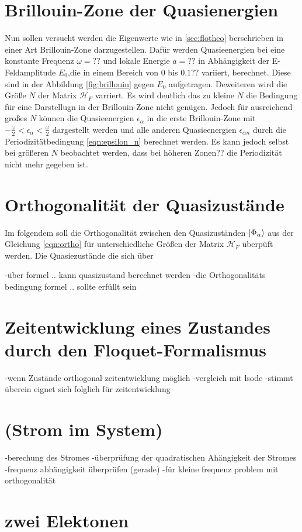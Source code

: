 \section{Brillouin-Zone der Quasienergien}
Nun sollen versucht werden die Eigenwerte wie in \ref{sec:flotheo} berschrieben in einer Art Brillouin-Zone darzugestellen.
Dafür werden Quasieenergien bei eine konstante Frequenz $\omega=??$ und lokale Energie $a=??$ in Abhängigkeit der
E-Feldamplitude $E_0$,die in einem
Bereich von $0$ bis $0.1 ??$ variiert,  berechnet.
Diese sind in der Abbildung \ref{fig:brillouin} gegen $E_0$ aufgetragen.
Deweiteren wird die Größe $N$ der Matrix $\mathcal{H}_F$ varriert.
Es wird deutlich das zu kleine $N$ die Bedingung für eine Darstellugn in der Brillouin-Zone nicht genügen.
Jedoch für ausreichend großes $N$ können die Quasieenergien $\epsilon_\alpha$ in die erste Brillouin-Zone
mit $-\frac{\omega}{2}<\epsilon_\alpha<\frac{\omega}{2}$ dargestellt werden und
alle anderen Quasieenergien $\epsilon_{\alpha n}$ durch die Periodizitätbedingung \eqref{eqn:epsilon_n} berechnet werden.
Es kann jedoch selbst bei größeren $N$ beobachtet werden, dass bei höheren Zonen?? die Periodizität nicht mehr gegeben ist.

\section{Orthogonalität der Quasizustände}
Im folgendem soll die Orthogonalität zwischen den Quasizuständen $\ket{\Phi_\alpha}$ aus der Gleichung \eqref{eqn:ortho} für
unterschiedliche Größen der Matrix $\mathcal{H}_F$ überpüft werden.
Die Quasiezustände die sich über


-über formel .. kann quasizustand berechnet werden
-die Orthogonalitäts bedingung formel .. sollte erfüllt sein

\section{Zeitentwicklung eines Zustandes durch den Floquet-Formalismus}
-wenn Zustände orthogonal zeitentwicklung möglich
-vergleich mit lsode
-stimmt überein eignet sich folglich für zeitentwicklung

\section{(Strom im System)}
-berechung des Stromes
-überprüfung der quadratischen Ahängigkeit der Stromes
-frequenz abhängigkeit überprüfen (gerade)
-für kleine frequenz problem mit orthogonalität

\section{zwei Elektonen}
